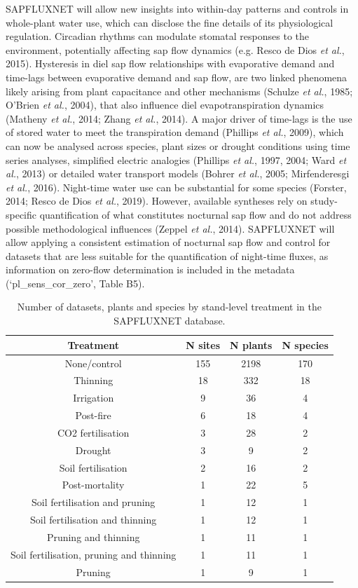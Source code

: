 \documentclass[11pt,twoside]{reedthesis}
\begin{document}
SAPFLUXNET will allow new insights into within-day patterns and controls
in whole-plant water use, which can disclose the fine details of its
physiological regulation. Circadian rhythms can modulate stomatal
responses to the environment, potentially affecting sap flow dynamics
(e.g. Resco de Dios \emph{et al.}, 2015). Hysteresis in diel sap flow
relationships with evaporative demand and time-lags between evaporative
demand and sap flow, are two linked phenomena likely arising from plant
capacitance and other mechanisms (Schulze \emph{et al.}, 1985; O'Brien
\emph{et al.}, 2004), that also influence diel evapotranspiration
dynamics (Matheny \emph{et al.}, 2014; Zhang \emph{et al.}, 2014). A
major driver of time-lags is the use of stored water to meet the
transpiration demand (Phillips \emph{et al.}, 2009), which can now be
analysed across species, plant sizes or drought conditions using time
series analyses, simplified electric analogies (Phillips \emph{et al.},
1997, 2004; Ward \emph{et al.}, 2013) or detailed water transport models
(Bohrer \emph{et al.}, 2005; Mirfenderesgi \emph{et al.}, 2016).
Night-time water use can be substantial for some species (Forster, 2014;
Resco de Dios \emph{et al.}, 2019). However, available syntheses rely on
study-specific quantification of what constitutes nocturnal sap flow and
do not address possible methodological influences (Zeppel \emph{et al.},
2014). SAPFLUXNET will allow applying a consistent estimation of
nocturnal sap flow and control for datasets that are less suitable for
the quantification of night-time fluxes, as information on zero-flow
determination is included in the metadata (`pl\_sens\_cor\_zero', Table
B5).\par
\begin{table}[!h]

\caption[Number of datasets, plants and species by stand-level treatment in the SAPFLUXNET database.]{\label{tab:Ch3T3}Number of datasets, plants and species by stand-level treatment in the SAPFLUXNET database.}
\centering
\fontsize{10}{12}\selectfont
\begin{tabular}[t]{cccc}
\toprule
Treatment & N sites & N plants & N species\\
\midrule
None/control & 155 & 2198 & 170\\
Thinning & 18 & 332 & 18\\
Irrigation & 9 & 36 & 4\\
Post-fire & 6 & 18 & 4\\
CO2 fertilisation & 3 & 28 & 2\\
Drought & 3 & 9 & 2\\
Soil fertilisation & 2 & 16 & 2\\
Post-mortality & 1 & 22 & 5\\
Soil fertilisation and pruning & 1 & 12 & 1\\
Soil fertilisation and thinning & 1 & 12 & 1\\
Pruning and thinning & 1 & 11 & 1\\
Soil fertilisation, pruning and thinning & 1 & 11 & 1\\
Pruning & 1 & 9 & 1\\
\bottomrule
\end{tabular}
\end{table}
\end{document}

